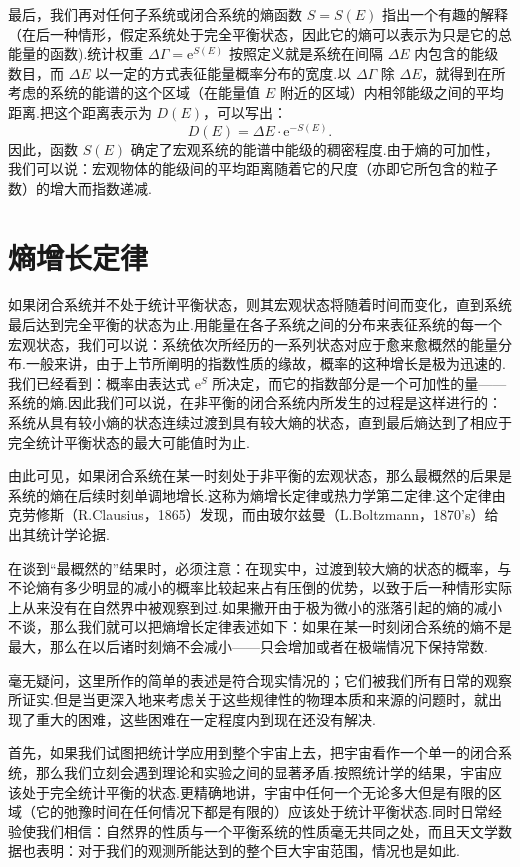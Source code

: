 最后，我们再对任何子系统或闭合系统的熵函数 $S=S(E)$ 指出一个有趣的解释（在后一种情形，假定系统处于完全平衡状态，因此它的熵可以表示为只是它的总能量的函数).统计权重 $\Delta\Gamma=\mathrm{e}^{S(E)}$ 按照定义就是系统在间隔 $\Delta E$ 内包含的能级数目，而 $\Delta E$ 以一定的方式表征能量概率分布的宽度.以 $\Delta\Gamma$ 除 $\Delta E$，就得到在所考虑的系统的能谱的这个区域（在能量值 $E$ 附近的区域）内相邻能级之间的平均距离.把这个距离表示为 $D(E)$，可以写出：
\begin{equation}
  D(E)=\Delta E\cdot\mathrm{e}^{-S(E)}.
\end{equation}
因此，函数 $S(E)$ 确定了宏观系统的能谱中能级的稠密程度.由于熵的可加性，我们可以说：宏观物体的能级间的平均距离随着它的尺度（亦即它所包含的粒子数）的增大而指数递减.

\section{熵增长定律}

如果闭合系统并不处于统计平衡状态，则其宏观状态将随着时间而变化，直到系统最后达到完全平衡的状态为止.用能量在各子系统之间的分布来表征系统的每一个宏观状态，我们可以说：系统依次所经历的一系列状态对应于愈来愈概然的能量分布.一般来讲，由于上节所阐明的指数性质的缘故，概率的这种增长是极为迅速的.我们已经看到：概率由表达式 $\mathrm{e}^{S}$ 所决定，而它的指数部分是一个可加性的量——系统的熵.因此我们可以说，在非平衡的闭合系统内所发生的过程是这样进行的：系统从具有较小熵的状态连续过渡到具有较大熵的状态，直到最后熵达到了相应于完全统计平衡状态的最大可能值时为止.

由此可见，如果闭合系统在某一时刻处于非平衡的宏观状态，那么最概然的后果是系统的熵在后续时刻单调地增长.这称为熵增长定律或热力学第二定律.这个定律由克劳修斯（R.Clausius，1865）发现，而由玻尔兹曼（L.Boltzmann，1870's）给出其统计学论据.

在谈到“最概然的”结果时，必须注意：在现实中，过渡到较大熵的状态的概率，与不论熵有多少明显的减小的概率比较起来占有压倒的优势，以致于后一种情形实际上从来没有在自然界中被观察到过.如果撇开由于极为微小的涨落引起的熵的减小不谈，那么我们就可以把熵增长定律表述如下：如果在某一时刻闭合系统的熵不是最大，那么在以后诸时刻熵不会减小——只会增加或者在极端情况下保持常数.

毫无疑问，这里所作的简单的表述是符合现实情况的；它们被我们所有日常的观察所证实.但是当更深入地来考虑关于这些规律性的物理本质和来源的问题时，就出现了重大的困难，这些困难在一定程度内到现在还没有解决.

首先，如果我们试图把统计学应用到整个宇宙上去，把宇宙看作一个单一的闭合系统，那么我们立刻会遇到理论和实验之间的显著矛盾.按照统计学的结果，宇宙应该处于完全统计平衡的状态.更精确地讲，宇宙中任何一个无论多大但是有限的区域（它的弛豫时间在任何情况下都是有限的）应该处于统计平衡状态.同时日常经验使我们相信：自然界的性质与一个平衡系统的性质毫无共同之处，而且天文学数据也表明：对于我们的观测所能达到的整个巨大宇宙范围，情况也是如此.

